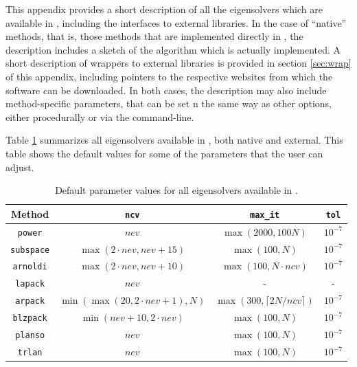 	This appendix provides a short description of all the eigensolvers which are available in \slepc, including the interfaces to external libraries. In the case of ``native'' methods, that is, those methods that are implemented directly in \slepc, the description includes a sketch of the algorithm which is actually implemented. A short description of wrappers to external libraries is provided in section \ref{sec:wrap} of this appendix, including pointers to the respective websites from which the software can be downloaded. In both cases, the description may also include method-specific parameters, that can be set n the same way as other \slepc options, either procedurally or via the command-line.

	Table \ref{tab:defaults} summarizes all eigensolvers available in \slepc, both native and external. This table shows the default values for some of the parameters that the user can adjust.
\begin{table}
\centering
\begin{tabular}{cccc} \hline
Method   & \texttt{ncv} & \texttt{max\_it} & \texttt{tol} \\ \hline
\texttt{power}    &  $nev$ & $\max(2000,100N)$ & $10^{-7}$ \\ 
\texttt{subspace} &  $\max(2\cdot nev,nev+15)$ & $\max(100,N)$ & $10^{-7}$ \\ 
\texttt{arnoldi}  &  $\max(2\cdot nev,nev+10)$ & $\max(100,N\cdot ncv)$ & $10^{-7}$ \\ 
\hline
\texttt{lapack}   &  $nev$ &         -          &    -      \\ 
\texttt{arpack}   &  $\min(\max(20,2\!\cdot\!nev\!+\!\!1),N)$ & $\max(300,\lceil 2N/ncv\rceil)$ & $10^{-7}$ \\ 
\texttt{blzpack}  &  $\min(nev\!+\!\!10,2\!\cdot\!nev)$ & $\max(100,N)$ & $10^{-7}$ \\ 
\texttt{planso}   &  $nev$ & $\max(100,N)$ & $10^{-7}$ \\ 
\texttt{trlan}    &  $nev$ & $\max(100,N)$ & $10^{-7}$ \\ \hline
\end{tabular}
\caption{\label{tab:defaults}Default parameter values for all eigensolvers available in \slepc.}
\end{table}

